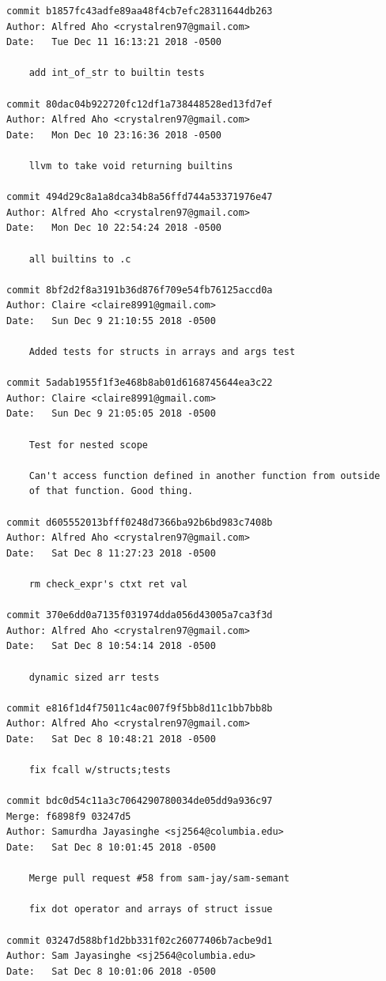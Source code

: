 \documentclass[12pt]{article}
\begin{document}
\begin{lstlisting}
commit b1857fc43adfe89aa48f4cb7efc28311644db263
Author: Alfred Aho <crystalren97@gmail.com>
Date:   Tue Dec 11 16:13:21 2018 -0500

    add int_of_str to builtin tests

commit 80dac04b922720fc12df1a738448528ed13fd7ef
Author: Alfred Aho <crystalren97@gmail.com>
Date:   Mon Dec 10 23:16:36 2018 -0500

    llvm to take void returning builtins

commit 494d29c8a1a8dca34b8a56ffd744a53371976e47
Author: Alfred Aho <crystalren97@gmail.com>
Date:   Mon Dec 10 22:54:24 2018 -0500

    all builtins to .c

commit 8bf2d2f8a3191b36d876f709e54fb76125accd0a
Author: Claire <claire8991@gmail.com>
Date:   Sun Dec 9 21:10:55 2018 -0500

    Added tests for structs in arrays and args test

commit 5adab1955f1f3e468b8ab01d6168745644ea3c22
Author: Claire <claire8991@gmail.com>
Date:   Sun Dec 9 21:05:05 2018 -0500

    Test for nested scope
    
    Can't access function defined in another function from outside
    of that function. Good thing.

commit d605552013bfff0248d7366ba92b6bd983c7408b
Author: Alfred Aho <crystalren97@gmail.com>
Date:   Sat Dec 8 11:27:23 2018 -0500

    rm check_expr's ctxt ret val

commit 370e6dd0a7135f031974dda056d43005a7ca3f3d
Author: Alfred Aho <crystalren97@gmail.com>
Date:   Sat Dec 8 10:54:14 2018 -0500

    dynamic sized arr tests

commit e816f1d4f75011c4ac007f9f5bb8d11c1bb7bb8b
Author: Alfred Aho <crystalren97@gmail.com>
Date:   Sat Dec 8 10:48:21 2018 -0500

    fix fcall w/structs;tests

commit bdc0d54c11a3c7064290780034de05dd9a936c97
Merge: f6898f9 03247d5
Author: Samurdha Jayasinghe <sj2564@columbia.edu>
Date:   Sat Dec 8 10:01:45 2018 -0500

    Merge pull request #58 from sam-jay/sam-semant
    
    fix dot operator and arrays of struct issue

commit 03247d588bf1d2bb331f02c26077406b7acbe9d1
Author: Sam Jayasinghe <sj2564@columbia.edu>
Date:   Sat Dec 8 10:01:06 2018 -0500


\end{lstlisting}
\end{document}
